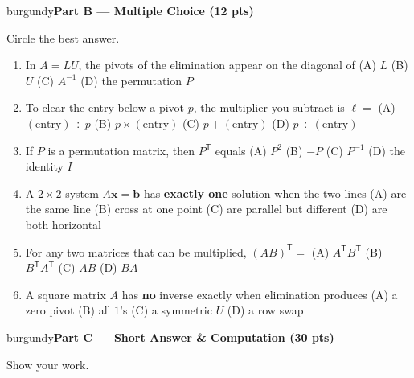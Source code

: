 \documentclass[10pt]{article}
\newcommand{\bb}{\mathbf{b}}
\newcommand{\xx}{\mathbf{x}}
\newcommand{\parthead}[1]{%
  \vspace{6pt}\noindent
  \begin{headlinebox}{burgundy}{\color{white}\bfseries #1}\end{headlinebox}%
  \vspace{4pt}}
\begin{document}
\parthead{Part B --- Multiple Choice (12 pts)}
Circle the best answer.

\begin{enumerate}[leftmargin=1.9em, itemsep=9pt]
  \item In $A=LU$, the pivots of the elimination appear on the diagonal of
    \hfill (A) $L$ \quad (B) $U$ \quad (C) $A^{-1}$ \quad (D) the permutation $P$
  \item To clear the entry below a pivot $p$, the multiplier you subtract is $\ell=$
    \hfill (A) $(\text{entry})\div p$ \quad (B) $p\times(\text{entry})$ \quad (C) $p+(\text{entry})$ \quad (D) $p\div(\text{entry})$
  \item If $P$ is a permutation matrix, then $P^{\mathsf T}$ equals
    \hfill (A) $P^2$ \quad (B) $-P$ \quad (C) $P^{-1}$ \quad (D) the identity $I$
  \item A $2\times2$ system $A\xx=\bb$ has \textbf{exactly one} solution when the two lines
    \hfill (A) are the same line \quad (B) cross at one point \quad (C) are parallel but different \quad (D) are both horizontal
  \item For any two matrices that can be multiplied, $(AB)^{\mathsf T}=$
    \hfill (A) $A^{\mathsf T}B^{\mathsf T}$ \quad (B) $B^{\mathsf T}A^{\mathsf T}$ \quad (C) $AB$ \quad (D) $BA$
  \item A square matrix $A$ has \textbf{no} inverse exactly when elimination produces
    \hfill (A) a zero pivot \quad (B) all $1$'s \quad (C) a symmetric $U$ \quad (D) a row swap
\end{enumerate}

\boxguard[12]
\parthead{Part C --- Short Answer \& Computation (30 pts)}
Show your work.
\end{document}

